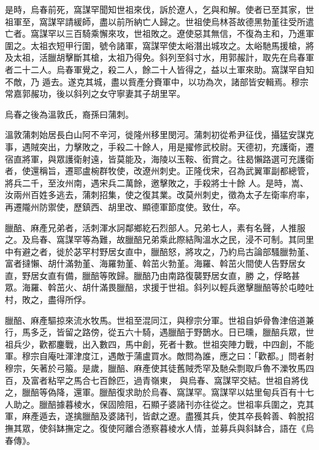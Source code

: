 \begin{pinyinscope}
 是時，烏春前死，窩謀罕聞知世祖來伐，訴於遼人，乞與和解。使者已至其家，世祖軍至，窩謀罕請緩師，盡以前所納亡人歸之。世祖使烏林荅故德黑勃堇往受所遣亡者。窩謀罕以三百騎乘懈來攻，世祖敗之。遼使惡其無信，不復為主和，乃進軍圍之。太祖衣短甲行圍，號令諸軍，窩謀罕使太峪潛出城攻之。太峪馳馬援槍，將及太祖，活臘胡擊斷其槍，太祖乃得免。斜列至斜寸水，用郭赧計，取先在烏春軍者二十二人。烏春軍覺之，殺二人，餘二十人皆得之，益以土軍來助。窩謀罕自知不敵，乃
 遁去。遂克其城，盡以貲產分賚軍中，以功為次，諸部皆安輯焉。穆宗常嘉郭赧功，後以斜列之女守寧妻其子胡里罕。



 烏春之後為溫敦氏，裔孫曰蒲刺。



 溫敦蒲刺始居長白山阿不辛河，徙隆州移里閔河。蒲刺初從希尹征伐，攝猛安謀克事，遇賊突出，力擊敗之，手殺二十餘人，用是擢修武校尉。天德初，充護衛，遷宿直將軍，與眾護衛射遠，皆莫能及，海陵以玉鞍、銜賞之。往曷懶路選可充護衛者，使還稱旨，遷耶盧椀群牧使，改遼州刺史。正隆伐宋，召為武翼軍副都總管，將兵二千，至汝州南，遇宋兵二萬餘，邀擊敗之，手殺將士十餘
 人。是時，嵩、汝兩州百姓多逃去，蒲刺招集，使之復其業。改莫州刺史，徵為太子左衛率府率，再遷隴州防禦使，歷鎮西、胡里改、顯德軍節度使。致仕，卒。



 臘醅、麻產兄弟者，活刺渾水訶鄰鄉紇石烈部人。兄弟七人，素有名聲，人推服之。及烏春、窩謀罕等為難，故臘醅兄弟乘此際結陶溫水之民，浸不可制。其同里中有避之者，徙於苾罕村野居女直中，臘醅怒，將攻之，乃約烏古論部騷臘勃堇、富者撻懶、胡什滿勃堇、海羅勃堇、斡茁火勃堇。海羅、斡茁火間使人告野居女直，野居女直有備，臘醅等敗歸。臘醅乃由南路復襲野居女直，勝
 之，俘略甚眾。海羅、斡茁火、胡什滿畏臘醅，求援于世祖。斜列以輕兵邀擊臘醅等於屯睦吐村，敗之，盡得所俘。



 臘醅、麻產驅掠來流水牧馬。世祖至混同江，與穆宗分軍。世祖自妒骨魯津倍道兼行，馬多乏，皆留之路傍，從五六十騎，遇臘醅于野鵲水。日已曛，臘醅兵眾，世祖兵少，歡都鏖戰，出入數四，馬中創，死者十數。世祖突陣力戰，中四創，不能軍。穆宗自庵吐渾津度江，遇敵于蒲盧買水。敵問為誰，應之曰：「歡都。」問者射穆宗，矢著於弓箙。是歲，臘醅、麻產使其徒舊賊禿罕及馳朵剽取戶魯不濼牧馬四百，及富者粘罕之馬合七百餘匹，過青嶺東，
 與烏春、窩謀罕交結。世祖自將伐之，臘醅等偽降，還軍。臘醅復求助於烏春、窩謀罕。窩謀罕以姑里甸兵百有十七人助之。臘醅據暮棱水，保固險阻，石顯子婆諸刊亦往從之。世祖率兵圍之，克其軍，麻產遁去，遂擒臘醅及婆諸刊，皆獻之遼。盡獲其兵，使其卒長斡善、斡脫招撫其眾，使斜缽撫定之。復使阿離合懣察暮棱水人情，並募兵與斜缽合，語在《烏春傳》。




\end{pinyinscope}
